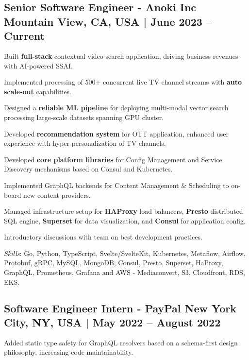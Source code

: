 \subsection{{Senior Software Engineer - Anoki Inc \hfill  Mountain View, CA, USA  | June 2023 -- Current}}
\begin{zitemize}
\item Built \textbf{full-stack} contextual video search application, driving business revenues with AI-powered SSAI.
\item Implemented processing of 500+ concurrent live TV channel streams with \textbf{auto scale-out} capabilities.
\item Designed a \textbf{reliable ML pipeline} for deploying multi-modal vector search processing large-scale datasets spanning GPU cluster. 
\item Developed \textbf{recommendation system} for OTT application, enhanced user experience with hyper-personalization of TV channels.
\item Developed \textbf{core platform libraries} for Config Management and Service Discovery mechanisms based on Consul and Kubernetes.
\item Implemented GraphQL backends for Content Management \& Scheduling to on-board new content providers.
\item Managed infrastructure setup for \textbf{HAProxy} load balancers, \textbf{Presto} distributed SQL engine, \textbf{Superset} for data visualization, and \textbf{Consul} for application config.
\item Introductory discussions with team on best development practices.
\end{zitemize}
\textit{Skills}: Go, Python, TypeScript, Svelte/SvelteKit, Kubernetes, Metaflow, Airflow, Protobuf, gRPC, MySQL, MongoDB, Consul, Presto, Superset, HaProxy, GraphQL, Prometheus, Grafana and AWS - Mediaconvert, S3, Cloudfront, RDS, EKS.
\vspace*{2mm}
\subsection{{Software Engineer Intern - PayPal \hfill New York City, NY, USA | May 2022 -- August 2022}}
\begin{zitemize}
\item Added static type safety for GraphQL resolvers based on a schema-first design philosophy, increasing code maintainability.
\end{zitemize}

